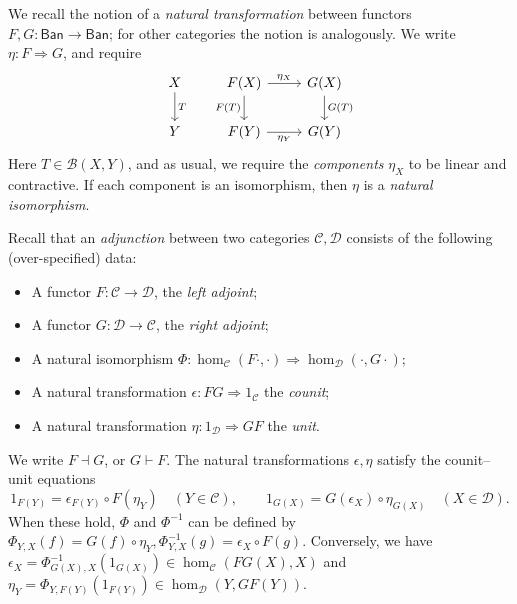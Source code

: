 \documentclass[a4paper,11pt]{article}
\theoremstyle{plain}
\theoremstyle{remark}
\newcommand{\mc}[1]{\mathcal{#1}}
\newcommand{\msf}[1]{\mathsf{#1}}
\begin{document}
We recall the notion of a \emph{natural transformation} between functors $F,G\colon \msf{Ban} \to \msf{Ban}$; for other categories the notion is analogously.  We write $\eta \colon F \Rightarrow G$, and require
\[ \begin{tikzcd}
X \arrow[d, "T"]    &
F(X) \arrow[r, "\eta_X"] \arrow[d, "F(T)"'] & G(X) \arrow[d, "G(T)"]
\\
Y    &
F(Y) \arrow[r, "\eta_Y"']  & G(Y)  
\end{tikzcd} \]
Here $T\in\mc B(X,Y)$, and as usual, we require the \emph{components} $\eta_X$ to be linear and contractive.  If each component is an isomorphism, then $\eta$ is a \emph{natural isomorphism}.

Recall that an \emph{adjunction} between two categories $\mc C, \mc D$ consists of the following (over-specified) data:
\begin{itemize}
  \item A functor $F\colon\mc C\to\mc D$, the \emph{left adjoint};
  \item A functor $G\colon\mc D \to \mc C$, the \emph{right adjoint};
  \item A natural isomorphism $\Phi \colon \hom_{\mc C}(F\cdot, \cdot) \Rightarrow \hom_{\mc D}(\cdot, G\cdot)$;
  \item A natural transformation $\epsilon \colon FG \Rightarrow 1_{\mc C}$ the \emph{counit};
  \item A natural transformation $\eta \colon 1_{\mc D} \Rightarrow GF$ the \emph{unit}.
\end{itemize}
We write $F \dashv G$, or $G \vdash F$.
The natural transformations $\epsilon, \eta$ satisfy the counit--unit equations
\[ 1_{F(Y)} = \epsilon_{F(Y)} \circ F(\eta_Y) \quad (Y\in \mc C), \qquad
1_{G(X)} = G(\epsilon_X) \circ \eta_{G(X)} \quad (X\in\mc D). \]
When these hold, $\Phi$ and $\Phi^{-1}$ can be defined by $\Phi_{Y,X}(f) = G(f)\circ\eta_Y, \Phi^{-1}_{Y,X}(g) = \epsilon_X\circ F(g)$.  Conversely, we have $\epsilon_X = \Phi^{-1}_{G(X), X}(1_{G(X)}) \in \hom_{\mc C}(FG(X), X)$ and $\eta_Y = \Phi_{Y,F(Y)}(1_{F(Y)}) \in \hom_{\mc D}(Y, GF(Y))$.
\end{document}
